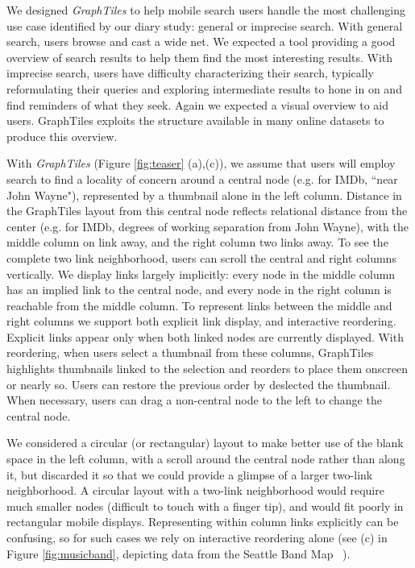 We designed \textit{GraphTiles} to help mobile search users handle the most challenging use case identified by our diary study: general or imprecise search. With general search, users browse and cast a wide net. We expected a tool providing a good overview of search results to help them find the most interesting results. With imprecise search, users have difficulty characterizing their search, typically reformulating their queries and exploring intermediate results to hone in on and find reminders of what they seek. Again we expected a visual overview to aid users. GraphTiles exploits the structure available in many online datasets to produce this overview. 

With \textit{GraphTiles} (Figure \ref{fig:teaser} (a),(c)), we assume that users will employ search to find a locality of concern around a central node (e.g. for IMDb, ``near John Wayne"), represented by a thumbnail alone in the left column. Distance in the GraphTiles layout from this central node reflects relational distance from the center (e.g. for IMDb, degrees of working separation from John Wayne), with the middle column on link away, and the right column two links away. To see the complete two link neighborhood, users can scroll the central and right columns vertically. We display links largely implicitly: every node in the middle column has an implied link to the central node, and every node in the right column is reachable from the middle column. To represent links between the middle and right columns we support both explicit link display, and interactive reordering. Explicit links appear only when both linked nodes are currently displayed. With reordering, when users select a thumbnail from these columns, GraphTiles highlights thumbnails linked to the selection and reorders to place them onscreen or nearly so. Users can restore the previous order by deslected the thumbnail. When necessary, users can drag a non-central node to the left to change the central node.

We considered a circular (or rectangular) layout to make better use of the blank space in the left column, with a scroll around the central node rather than along it, but discarded it so that we could provide a glimpse of a larger two-link neighborhood. A circular layout with a two-link neighborhood would require much smaller nodes (difficult to touch with a finger tip), and would fit poorly in rectangular mobile displays. Representing within column links explicitly can be confusing, so for such cases we rely on interactive reordering alone (see (c) in Figure \ref{fig:musicband}, depicting data from the Seattle Band Map ~\cite{seattleband}).